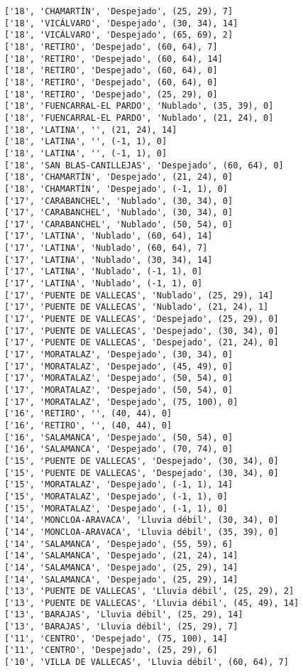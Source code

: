 \documentclass[11pt]{article}
\begin{document}
\begin{Verbatim}[commandchars=\\\{\}]
['18', 'CHAMARTÍN', 'Despejado', (25, 29), 7]
['18', 'VICÁLVARO', 'Despejado', (30, 34), 14]
['18', 'VICÁLVARO', 'Despejado', (65, 69), 2]
['18', 'RETIRO', 'Despejado', (60, 64), 7]
['18', 'RETIRO', 'Despejado', (60, 64), 14]
['18', 'RETIRO', 'Despejado', (60, 64), 0]
['18', 'RETIRO', 'Despejado', (60, 64), 0]
['18', 'RETIRO', 'Despejado', (25, 29), 0]
['18', 'FUENCARRAL-EL PARDO', 'Nublado', (35, 39), 0]
['18', 'FUENCARRAL-EL PARDO', 'Nublado', (21, 24), 0]
['18', 'LATINA', '', (21, 24), 14]
['18', 'LATINA', '', (-1, 1), 0]
['18', 'LATINA', '', (-1, 1), 0]
['18', 'SAN BLAS-CANILLEJAS', 'Despejado', (60, 64), 0]
['18', 'CHAMARTÍN', 'Despejado', (21, 24), 0]
['18', 'CHAMARTÍN', 'Despejado', (-1, 1), 0]
['17', 'CARABANCHEL', 'Nublado', (30, 34), 0]
['17', 'CARABANCHEL', 'Nublado', (30, 34), 0]
['17', 'CARABANCHEL', 'Nublado', (50, 54), 0]
['17', 'LATINA', 'Nublado', (60, 64), 14]
['17', 'LATINA', 'Nublado', (60, 64), 7]
['17', 'LATINA', 'Nublado', (30, 34), 14]
['17', 'LATINA', 'Nublado', (-1, 1), 0]
['17', 'LATINA', 'Nublado', (-1, 1), 0]
['17', 'PUENTE DE VALLECAS', 'Nublado', (25, 29), 14]
['17', 'PUENTE DE VALLECAS', 'Nublado', (21, 24), 1]
['17', 'PUENTE DE VALLECAS', 'Despejado', (25, 29), 0]
['17', 'PUENTE DE VALLECAS', 'Despejado', (30, 34), 0]
['17', 'PUENTE DE VALLECAS', 'Despejado', (21, 24), 0]
['17', 'MORATALAZ', 'Despejado', (30, 34), 0]
['17', 'MORATALAZ', 'Despejado', (45, 49), 0]
['17', 'MORATALAZ', 'Despejado', (50, 54), 0]
['17', 'MORATALAZ', 'Despejado', (50, 54), 0]
['17', 'MORATALAZ', 'Despejado', (75, 100), 0]
['16', 'RETIRO', '', (40, 44), 0]
['16', 'RETIRO', '', (40, 44), 0]
['16', 'SALAMANCA', 'Despejado', (50, 54), 0]
['16', 'SALAMANCA', 'Despejado', (70, 74), 0]
['15', 'PUENTE DE VALLECAS', 'Despejado', (30, 34), 0]
['15', 'PUENTE DE VALLECAS', 'Despejado', (30, 34), 0]
['15', 'MORATALAZ', 'Despejado', (-1, 1), 14]
['15', 'MORATALAZ', 'Despejado', (-1, 1), 0]
['15', 'MORATALAZ', 'Despejado', (-1, 1), 0]
['14', 'MONCLOA-ARAVACA', 'Lluvia débil', (30, 34), 0]
['14', 'MONCLOA-ARAVACA', 'Lluvia débil', (35, 39), 0]
['14', 'SALAMANCA', 'Despejado', (55, 59), 6]
['14', 'SALAMANCA', 'Despejado', (21, 24), 14]
['14', 'SALAMANCA', 'Despejado', (25, 29), 14]
['14', 'SALAMANCA', 'Despejado', (25, 29), 14]
['13', 'PUENTE DE VALLECAS', 'Lluvia débil', (25, 29), 2]
['13', 'PUENTE DE VALLECAS', 'Lluvia débil', (45, 49), 14]
['13', 'BARAJAS', 'Lluvia débil', (25, 29), 14]
['13', 'BARAJAS', 'Lluvia débil', (25, 29), 7]
['11', 'CENTRO', 'Despejado', (75, 100), 14]
['11', 'CENTRO', 'Despejado', (25, 29), 6]
['10', 'VILLA DE VALLECAS', 'Lluvia débil', (60, 64), 7]

\end{Verbatim}
\end{document}
